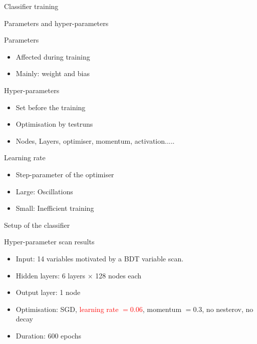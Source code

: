 \begin{frame}[c]
\begin{center}
\Huge Classifier training
\end{center}
\end{frame}

\begin{frame}{Parameters and hyper-parameters}
\begin{block}{Parameters}
\begin{itemize}
\item Affected during training
\item Mainly: weight and bias
\end{itemize}
\end{block}
\begin{block}{Hyper-parameters}
\begin{itemize}
\item Set before the training
\item Optimisation by testruns
\item Nodes, Layers, optimiser, momentum, activation.....
\end{itemize}
\end{block}
\begin{block}{Learning rate}
\begin{itemize}
\item Step-parameter of the optimiser
\item Large: Oscillations
\item Small: Inefficient training
\end{itemize}
\end{block}
\end{frame}

\begin{frame}{Setup of the classifier}
\begin{block}{Hyper-parameter scan results}
\begin{itemize}
\item Input: \num{14} variables motivated by a BDT variable scan.
\item Hidden layers: \num{6} \ELU layers $\times$ \num{128} nodes each
\item Output layer: \num{1} \SIGMOID node
\item Optimisation: SGD, \textcolor{red}{learning rate $=0.06$}, momentum $=0.3$, no nesterov, no decay
\item Duration: 600 epochs
\end{itemize}
\end{block}
\end{frame}

